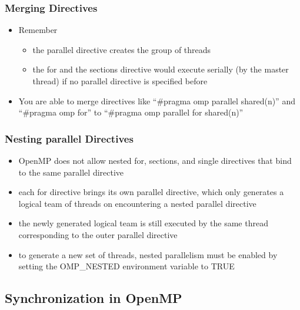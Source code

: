 \clearpage
\hypertarget{merging-directives}{%
\subsubsection{Merging Directives}\label{merging-directives}}

\begin{itemize}
\tightlist
\item
  Remember

  \begin{itemize}
  \tightlist
  \item
    the parallel directive creates the group of threads
  \item
    the for and the sections directive would execute serially (by the
    master thread) if no parallel directive is specified before
  \end{itemize}
\item
  You are able to merge directives like ``\#pragma omp parallel
  shared(n)'' and ``\#pragma omp for'' to ``\#pragma omp parallel for
  shared(n)''
\end{itemize}

\hypertarget{nesting-parallel-directives}{%
\subsubsection{Nesting parallel
Directives}\label{nesting-parallel-directives}}

\begin{itemize}
\tightlist
\item
  OpenMP does not allow nested for, sections, and single directives that
  bind to the same parallel directive
\item
  each for directive brings its own parallel directive, which only
  generates a logical team of threads on encountering a nested parallel
  directive
\item
  the newly generated logical team is still executed by the same thread
  corresponding to the outer parallel directive
\item
  to generate a new set of threads, nested parallelism must be enabled
  by setting the OMP\_NESTED environment variable to TRUE
\end{itemize}

\hypertarget{synchronization-in-openmp}{%
\subsection{Synchronization in OpenMP}\label{synchronization-in-openmp}}

